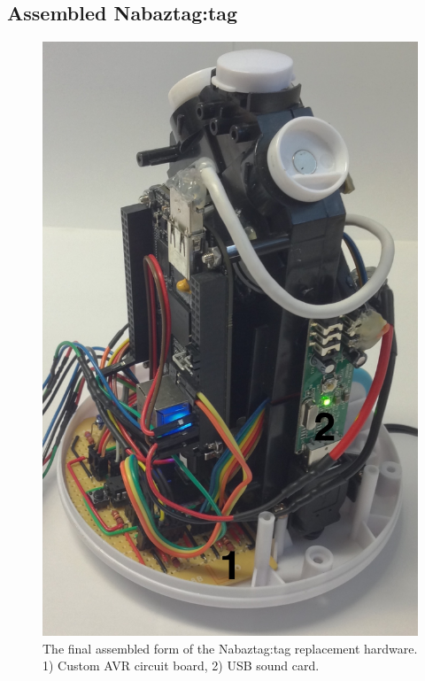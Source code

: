 \documentclass[12pt, a4paper]{article}
\begin{document}
\begin{appendices}
\section{Assembled Nabaztag:tag}\label{app:assembled}
	\begin{figure}[H]
		\centerline{\includegraphics[scale=0.25]{images/nabazleft.jpg}}
		\caption[Assembled Nabaztag:tag 1]{The final assembled form of the Nabaztag:tag replacement hardware. 1) Custom AVR circuit board, 2) \ac{USB} sound card.}
		\label{fig:assembled1}
	\end{figure}
	
	\newpage
	

\end{appendices}
\end{document}

